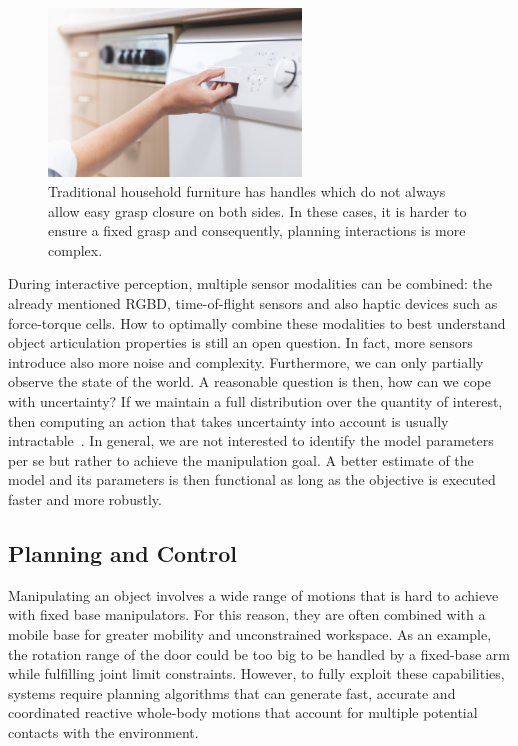 \begin{figure}[h!]
    \centering
    \includegraphics[width=0.6\textwidth]{images/dishwasher_handle.png}
    \caption{Traditional household furniture has handles which do not always allow easy grasp closure on both sides. In these cases, it is harder to ensure a fixed grasp and consequently, planning interactions is more complex.}
    \label{fig:dishwasher_handle}
\end{figure}


During interactive perception, multiple sensor modalities can be combined: the already mentioned RGBD, time-of-flight sensors and also haptic devices such as force-torque cells. How to optimally combine these modalities to best understand object articulation properties is still an open question. In fact, more sensors introduce also more noise and complexity. Furthermore, we can only partially observe the state of the world. A reasonable question is then, how can we cope with uncertainty? If we maintain a full distribution over the quantity of interest, then computing an action that takes uncertainty into account is usually intractable~\cite{lavalle2006planning}. In general, we are not interested to identify the model parameters per se but rather to achieve the manipulation goal. A better estimate of the model and its parameters is then functional as long as the objective is executed faster and more robustly.

\subsection{Planning and Control}
Manipulating an object involves a wide range of motions that is hard to achieve with fixed base manipulators. For this reason, they are often combined with a mobile base for greater mobility and unconstrained workspace. As an example, the rotation range of the door could be too big to be handled by a fixed-base arm while fulfilling joint limit constraints. However, to fully exploit these capabilities, systems require planning algorithms that can generate fast, accurate and coordinated reactive whole-body motions that account for multiple potential contacts with the environment.

